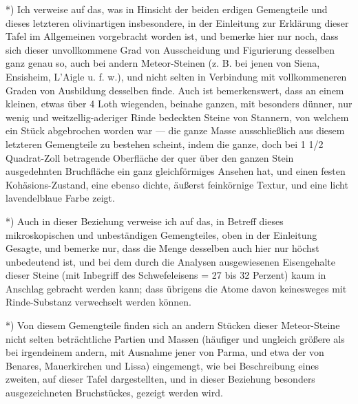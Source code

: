 \documentclass[a4paper, 11pt, oneside, german]{article}
\begin{document}
*) Ich verweise auf das, was in Hinsicht der beiden erdigen Gemengteile und dieses letzteren olivinartigen insbesondere, in der Einleitung zur Erklärung dieser Tafel im Allgemeinen vorgebracht worden ist, und bemerke hier nur noch, dass sich dieser unvollkommene Grad von Ausscheidung und Figurierung desselben ganz genau so, auch bei andern Meteor-Steinen (z. B. bei jenen von Siena, Ensisheim, L'Aigle u. f. w.), und nicht selten in Verbindung mit vollkommeneren Graden von Ausbildung desselben finde. Auch ist bemerkenswert, dass an einem kleinen, etwas über 4 Loth wiegenden, beinahe ganzen, mit besonders dünner, nur wenig und weitzellig-aderiger Rinde bedeckten Steine von Stannern, von welchem ein Stück abgebrochen worden war --- die ganze Masse ausschließlich aus diesem letzteren Gemengteile zu bestehen scheint, indem die ganze, doch bei 1 1/2 Quadrat-Zoll betragende Oberfläche der quer über den ganzen Stein ausgedehnten Bruchfläche ein ganz gleichförmiges Ansehen hat, und einen festen Kohäsions-Zustand, eine ebenso dichte, äußerst feinkörnige Textur, und eine licht lavendelblaue Farbe zeigt.

*) Auch in dieser Beziehung verweise ich auf das, in Betreff dieses mikroskopischen und unbeständigen Gemengteiles, oben in der Einleitung Gesagte, und bemerke nur, dass die Menge desselben auch hier nur höchst unbedeutend ist, und bei dem durch die Analysen ausgewiesenen Eisengehalte dieser Steine (mit Inbegriff des Schwefeleisens = 27 bis 32 Perzent) kaum in Anschlag gebracht werden kann; dass übrigens die Atome davon keinesweges mit Rinde-Substanz verwechselt werden können.

*) Von diesem Gemengteile finden sich an andern Stücken dieser Meteor-Steine nicht selten beträchtliche Partien und Massen (häufiger und ungleich größere als bei irgendeinem andern, mit Ausnahme jener von Parma, und etwa der von Benares, Mauerkirchen und Lissa) eingemengt, wie bei Beschreibung eines zweiten, auf dieser Tafel dargestellten, und in dieser Beziehung besonders ausgezeichneten Bruchstückes, gezeigt werden wird.
\end{document}
